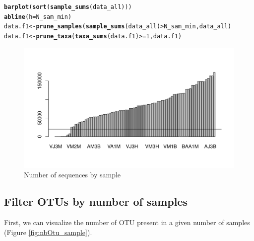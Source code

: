 \documentclass[12pt]{article}\usepackage[]{graphicx}\usepackage[]{color}
\makeatletter
\def\maxwidth{ %
  \ifdim\Gin@nat@width>\linewidth
    \linewidth
  \else
    \Gin@nat@width
  \fi
}
\newcommand{\hlnum}[1]{\textcolor[rgb]{0.686,0.059,0.569}{#1}}%
\newcommand{\hlopt}[1]{\textcolor[rgb]{0,0,0}{#1}}%
\newcommand{\hlstd}[1]{\textcolor[rgb]{0.345,0.345,0.345}{#1}}%
\newcommand{\hlkwb}[1]{\textcolor[rgb]{0.69,0.353,0.396}{#1}}%
\newcommand{\hlkwc}[1]{\textcolor[rgb]{0.333,0.667,0.333}{#1}}%
\newcommand{\hlkwd}[1]{\textcolor[rgb]{0.737,0.353,0.396}{\textbf{#1}}}%
\newenvironment{kframe}{%
 \def\at@end@of@kframe{}%
 \ifinner\ifhmode%
  \def\at@end@of@kframe{\end{minipage}}%
  \begin{minipage}{\columnwidth}%
 \fi\fi%
 \def\FrameCommand##1{\hskip\@totalleftmargin \hskip-\fboxsep
 \colorbox{shadecolor}{##1}\hskip-\fboxsep
     \hskip-\linewidth \hskip-\@totalleftmargin \hskip\columnwidth}%
 \MakeFramed {\advance\hsize-\width
   \@totalleftmargin\z@ \linewidth\hsize
   \@setminipage}}%
 {\par\unskip\endMakeFramed%
 \at@end@of@kframe}
\newenvironment{knitrout}{}{} %
\numberwithin{figure}{section}
\makeatother
\begin{document}
\begin{knitrout}\small
{}\color{fgcolor}\begin{kframe}
\begin{alltt}
\hlkwd{barplot}\hlstd{(}\hlkwd{sort}\hlstd{(}\hlkwd{sample_sums}\hlstd{(data_all)))}
\hlkwd{abline}\hlstd{(}\hlkwc{h} \hlstd{= N_sam_min)}
\hlstd{data.f1} \hlkwb{<-} \hlkwd{prune_samples}\hlstd{(}\hlkwd{sample_sums}\hlstd{(data_all)} \hlopt{>} \hlstd{N_sam_min, data_all)}
\hlstd{data.f1} \hlkwb{<-} \hlkwd{prune_taxa}\hlstd{(}\hlkwd{taxa_sums}\hlstd{(data.f1)} \hlopt{>=}  \hlnum{1}\hlstd{, data.f1)}
\end{alltt}
\end{kframe}\begin{figure}

{\centering \includegraphics[width=\maxwidth]{figure/unnamed-chunk-12-1} 

}

\caption[Number of sequences by sample]{Number of sequences by sample}\label{fig:unnamed-chunk-12}
\end{figure}


\end{knitrout}

  \subsection{Filter OTUs by number of samples}

First, we can visualize the number of OTU present in a given number of samples (Figure \ref{fig:nbOtu_sample}).
\end{document}
